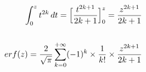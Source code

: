 \documentclass[preview]{standalone}
\begin{document}
\begin{align*}
\int_0^z { t^{2k} } \, dt = \Big[ \frac{t^{2k+1}}{2k+1} \Big]_0^z = \frac{z^{2k+1}}{2k+1} \\ \\ erf(z) = { \frac{2}{\sqrt{\pi}} } \sum_{k=0}^{+\infty} (-1)^k \times { {1} \over {k!} } \times { {z^{2k+1}} \over {2k+1} }
\end{align*}
\end{document}
